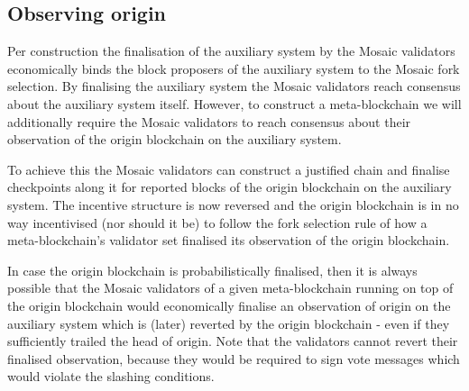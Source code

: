 \documentclass[12pt,a4paper]{article}
\begin{document}

\subsection{Observing origin}
\label{observing_origin}


Per construction the finalisation of the auxiliary system by the Mosaic validators economically binds the block proposers of the auxiliary system to the Mosaic fork selection.
By finalising the auxiliary system the Mosaic validators reach consensus about the auxiliary system itself.
However, to construct a meta-blockchain we will additionally require the Mosaic validators to reach consensus about their observation of the origin blockchain on the auxiliary system.

To achieve this the Mosaic validators can construct a justified chain and finalise checkpoints along it for reported blocks of the origin blockchain on the auxiliary system.
The incentive structure is now reversed and the origin blockchain is in no way incentivised (nor should it be) to follow the fork selection rule of how a meta-blockchain's validator set finalised its observation of the origin blockchain.

In case the origin blockchain is probabilistically finalised, then it is always possible that the Mosaic validators of a given meta-blockchain running on top of the origin blockchain would economically finalise an observation of origin on the auxiliary system which is (later) reverted by the origin blockchain - even if they sufficiently trailed the head of origin.
Note that the validators cannot revert their finalised observation, because they would be required to sign vote messages which would violate the slashing conditions.
\end{document}
